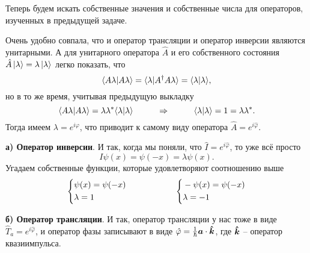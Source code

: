 Теперь будем искать собственные значения и собственные числа для операторов, изученных в предыдущей задаче.

Очень удобно совпала, что и оператор трансляции и оператор инверсии являются унитарными. А для унитарного оператора $\hat{A}$ и его собственного состояния $\hat{A} \left| \lambda \right\rangle = \lambda \left| \lambda \right\rangle$ легко показать, что
\begin{equation*}
\bk{A \lambda}{A \lambda} = \bk{\lambda}{A^\dagger A \lambda} = \bk{\lambda}{\lambda},
\end{equation*}
но в то же время, учитывая предыдущую выкладку
\begin{equation*}
	\bk{A \lambda}{A \lambda} = \lambda \lambda^*\bk{\lambda}{\lambda}
	\hspace{1 cm}
	\Rightarrow
	\hspace{1 cm}
	\bk{\lambda}{\lambda} = 1 = \lambda \lambda^*.
\end{equation*}
Тогда имеем $\lambda = e^{i \varphi}$, что приводит к самому виду оператора $\hat{A} = e^{i \hat{\varphi}}$.

\phantom{42}

\textbf*{а) Оператор инверсии}.
И так, когда мы поняли, что $\hat{I} = e ^{i \hat{\varphi}}$, то уже всё просто
\begin{equation*}
	I \psi(x) = \psi(-x) = \lambda \psi(x).
\end{equation*}
Угадаем собственные функции, которые удовлетворяют соотношению выше 
\begin{equation*}
	\left\{\begin{aligned}
		&\psi(x) = \psi(-x)\\
		&\lambda = 1
	\end{aligned}\right.
	\hspace{2 cm}
	\left\{\begin{aligned}
		&- \psi(x) = \psi(-x)\\
		&\lambda = -1
	\end{aligned}\right.
\end{equation*}

\phantom{42}

\textbf*{б) Оператор трансляции}.
И так, оператор трансляции у нас тоже в виде $\hat{T}_a = e^{i \hat{\varphi}}$, и оператор фазы записывают в виде $\hat{\varphi} = \frac{1}{\hbar} \mbox{\boldmath $a$} \cdot \mbox{\boldmath $\hat{k}$}$, где $\mbox{\boldmath $\hat{k}$}$ -- оператор квазиимпульса.

